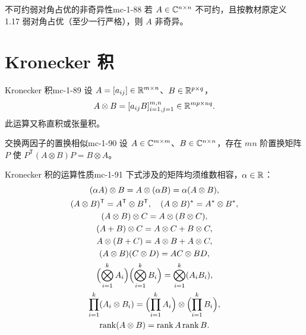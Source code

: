 \begin{theorem}{不可约弱对角占优的非奇异性}{mc-1-88}
若 $A\in\mathbb{C}^{n\times n}$ 不可约，且按教材原定义 1.17 弱对角占优（至少一行严格），则 $A$ 非奇异。
\end{theorem}

\section{Kronecker 积}

\begin{definition}{Kronecker 积}{mc-1-89}
设 $A=[a_{ij}]\in\mathbb{R}^{m\times n}$、$B\in\mathbb{R}^{p\times q}$，
\[A\otimes B=[a_{ij}B]_{i=1,j=1}^{m,n}\in\mathbb{R}^{mp\times nq}.\]
此运算又称直积或张量积。
\end{definition}

\begin{theorem}{交换两因子的置换相似}{mc-1-90}
设 $A\in\mathbb{C}^{m\times m}$、$B\in\mathbb{C}^{n\times n}$，存在 $mn$ 阶置换矩阵 $P$ 使 $P^{\mathsf T}(A\otimes B)P=B\otimes A$。
\end{theorem}

\begin{theorem}{Kronecker 积的运算性质}{mc-1-91}
下式涉及的矩阵均须维数相容，$\alpha\in\mathbb{R}$：
\[
\begin{gathered}
(\alpha A)\otimes B=A\otimes(\alpha B)=\alpha(A\otimes B),\\
(A\otimes B)^{\mathsf T}=A^{\mathsf T}\otimes B^{\mathsf T},\quad(A\otimes B)^*=A^*\otimes B^*,\\
(A\otimes B)\otimes C=A\otimes(B\otimes C),\\
(A+B)\otimes C=A\otimes C+B\otimes C,\\
A\otimes(B+C)=A\otimes B+A\otimes C,\\
(A\otimes B)(C\otimes D)=AC\otimes BD,\\
\Bigl(\bigotimes_{i=1}^kA_i\Bigr)\Bigl(\bigotimes_{i=1}^kB_i\Bigr)=\bigotimes_{i=1}^k(A_iB_i),\\
\prod_{i=1}^k(A_i\otimes B_i)=\Bigl(\prod_{i=1}^kA_i\Bigr)\otimes\Bigl(\prod_{i=1}^kB_i\Bigr),\\
\operatorname{rank}(A\otimes B)=\operatorname{rank} A\operatorname{rank} B.
\end{gathered}
\]
\end{theorem}

